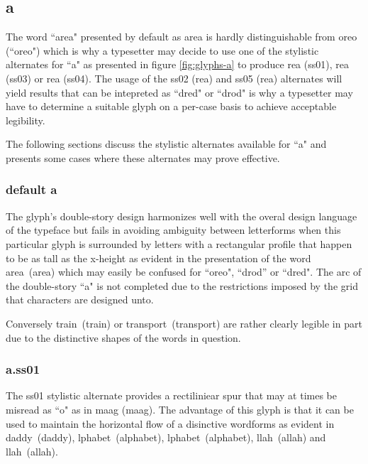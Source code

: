 \subsection{a}

The word ``area" presented by default as {\ssdefault area} is hardly
distinguishable from {\ssdefault oreo} (``oreo") which is why a typesetter may
decide to use one of the stylistic alternates for ``a" as presented in figure
\ref{fig:glyphs-a} to produce
{re{\ssone a}} (ss01),
{re{\ssthree a}} (ss03) or
{re{\ssfour a}} (ss04).
The usage of the ss02 ({re{\sstwo a}}) and
ss05 ({re{\ssfive a}}) alternates will yield results
that can be intepreted as ``dred" or ``drod" is why a typesetter may
have to determine a suitable glyph on a per-case basis to achieve acceptable
legibility.


The following sections discuss the stylistic alternates available for ``a" and
presents some cases where these alternates may prove effective.

\subsubsection{default {\ssdefault a}}

The glyph's double-story design harmonizes well with the overal design
language of the typeface but fails in avoiding ambiguity between letterforms
when this particular glyph is surrounded by letters with a rectangular profile
that happen to be as tall as the x-height as evident in the presentation of the
word \mbox{{\ssdefault area} (area)} which may easily be confused for ``oreo",
``drod'' or ``dred". The arc of the double-story ``a" is not completed due to
the restrictions imposed by the grid that characters are designed unto.

Conversely
\mbox{{\ssdefault train} (train)} or
\mbox{{\ssdefault transport} (transport)}
are rather clearly legible in part due to the distinctive shapes of the words
in question.

\subsubsection{{\ssone a}.ss01}

The ss01 stylistic alternate provides a rectiliniear spur that may at times be
misread as ``o" as in \mbox{\ssdefault m{\ssone aa}g} (maag). The advantage of
this glyph is that it can be used to maintain the horizontal flow of a disinctive
wordforms as evident in
\mbox{{\ssdefault d{\ssone a}ddy} (daddy)},
\mbox{{lphabet} (alphabet)},
\mbox{{lph{\ssone a}bet} (alphabet)},
\mbox{{llah} (allah)} and
\mbox{{ll{\ssone a}h} (allah)}.


